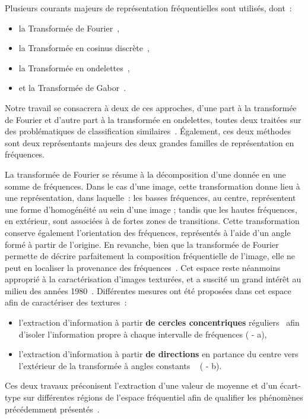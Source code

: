 Plusieurs courants majeurs de représentation fréquentielles sont utilisés, dont~: 
\begin{itemize}
    \item la Transformée de Fourier~\cite{Ursani2007, Smach2008a},
    \item la Transformée en cosinus discrète~\cite{Sorwar2001},
    \item la Transformée en ondelettes~\cite{Arivazhagan2003,Hong2010},
    \item et la Transformée de Gabor~\cite{Ursani2007}.
\end{itemize}
Notre travail se consacrera à deux de ces approches, d'une part à la transformée de Fourier et d'autre part à la transformée en ondelettes, toutes deux traitées sur des problématiques de classification similaires~\cite{Wiltgen2008,Halimi2017a,Halimi2017b}. Également, ces deux méthodes sont deux représentants majeurs des deux grandes familles de représentation en fréquences.\par

La transformée de Fourier se résume à la décomposition d'une donnée en une somme de fréquences. Dans le cas d'une image, cette transformation donne lieu à une représentation, dans laquelle~: les basses fréquences, au centre, représentent une forme d'homogénéité au sein d'une image ; tandis que les hautes fréquences, en extérieur, sont associées à de fortes zones de transitions. Cette transformation conserve également l'orientation des fréquences, représentés à l'aide d'un angle formé à partir de l'origine. En revanche, bien que la transformée de Fourier permette de décrire parfaitement la composition fréquentielle de l'image, elle ne peut en localiser la provenance des fréquences~\cite{Wiltgen2008}. Cet espace reste néanmoins approprié à la caractérisation d'images texturées, et a suscité un grand intérêt au milieu des années 1980~\cite{Persoon1986}. Différentes mesures ont été proposées dans cet espace afin de caractériser des textures~:
\begin{itemize}
    \item l'extraction d'information à partir \textbf{de cercles concentriques} réguliers~\cite{Smach2008a, Wiltgen2008} afin d'isoler l'information propre à chaque intervalle de fréquences ( - a),
    \item l'extraction d'information à partir \textbf{de directions} en partance du centre vers l'extérieur de la transformée à angles constants ~\cite{Wiltgen2008} ( - b).
\end{itemize}
Ces deux travaux préconisent l'extraction d'une valeur de moyenne et d'un écart-type sur différentes régions de l'espace fréquentiel afin de qualifier les phénomènes précédemment présentés~\cite{Smach2008a, Wiltgen2008}. 


